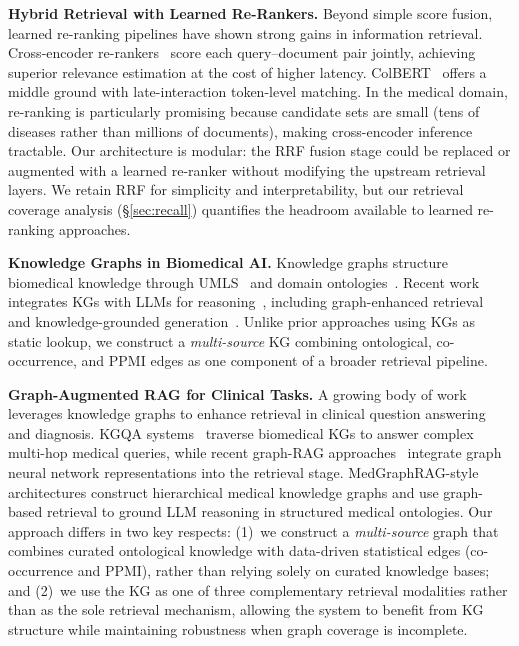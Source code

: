 \documentclass[runningheads]{llncs}
\begin{document}
\textbf{Hybrid Retrieval with Learned Re-Rankers.} Beyond simple score fusion, learned re-ranking pipelines have shown strong gains in information retrieval. Cross-encoder re-rankers~\cite{nogueira2020passage} score each query--document pair jointly, achieving superior relevance estimation at the cost of higher latency. ColBERT~\cite{khattab2020colbert} offers a middle ground with late-interaction token-level matching. In the medical domain, re-ranking is particularly promising because candidate sets are small (tens of diseases rather than millions of documents), making cross-encoder inference tractable. Our architecture is modular: the RRF fusion stage could be replaced or augmented with a learned re-ranker without modifying the upstream retrieval layers. We retain RRF for simplicity and interpretability, but our retrieval coverage analysis (\S\ref{sec:recall}) quantifies the headroom available to learned re-ranking approaches.

\textbf{Knowledge Graphs in Biomedical AI.} Knowledge graphs structure biomedical knowledge through UMLS~\cite{bodenreider2004unified} and domain ontologies~\cite{santos2022knowledge,chandak2023building}. Recent work integrates KGs with LLMs for reasoning~\cite{pan2024unifying}, including graph-enhanced retrieval~\cite{he2024gretriever} and knowledge-grounded generation~\cite{yasunaga2022deep}. Unlike prior approaches using KGs as static lookup, we construct a \emph{multi-source} KG combining ontological, co-occurrence, and PPMI edges as one component of a broader retrieval pipeline.

\textbf{Graph-Augmented RAG for Clinical Tasks.} A growing body of work leverages knowledge graphs to enhance retrieval in clinical question answering and diagnosis. KGQA systems~\cite{pan2024unifying} traverse biomedical KGs to answer complex multi-hop medical queries, while recent graph-RAG approaches~\cite{he2024gretriever} integrate graph neural network representations into the retrieval stage. MedGraphRAG-style architectures construct hierarchical medical knowledge graphs and use graph-based retrieval to ground LLM reasoning in structured medical ontologies. Our approach differs in two key respects: (1)~we construct a \emph{multi-source} graph that combines curated ontological knowledge with data-driven statistical edges (co-occurrence and PPMI), rather than relying solely on curated knowledge bases; and (2)~we use the KG as one of three complementary retrieval modalities rather than as the sole retrieval mechanism, allowing the system to benefit from KG structure while maintaining robustness when graph coverage is incomplete.
\end{document}
